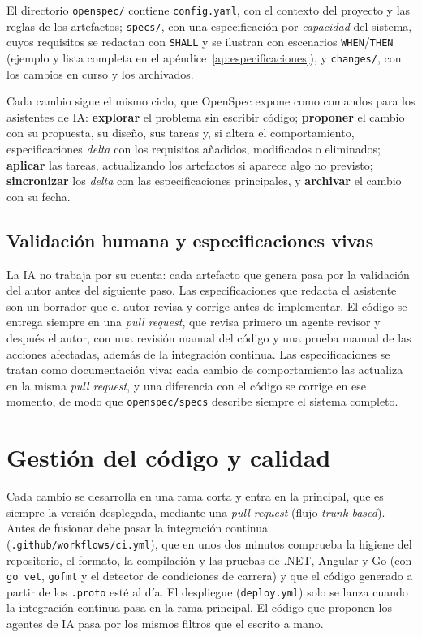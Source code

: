 El directorio \texttt{openspec/} contiene \texttt{config.yaml}, con el contexto del proyecto y las reglas de los artefactos; \texttt{specs/}, con una especificación por \emph{capacidad} del sistema, cuyos requisitos se redactan con \texttt{SHALL} y se ilustran con escenarios \texttt{WHEN}/\texttt{THEN} (ejemplo y lista completa en el apéndice~\ref{ap:especificaciones}), y \texttt{changes/}, con los cambios en curso y los archivados.

Cada cambio sigue el mismo ciclo, que OpenSpec expone como comandos para los asistentes de IA: \textbf{explorar} el problema sin escribir código; \textbf{proponer} el cambio con su propuesta, su diseño, sus tareas y, si altera el comportamiento, especificaciones \emph{delta} con los requisitos añadidos, modificados o eliminados; \textbf{aplicar} las tareas, actualizando los artefactos si aparece algo no previsto; \textbf{sincronizar} los \emph{delta} con las especificaciones principales, y \textbf{archivar} el cambio con su fecha.

\subsection{Validación humana y especificaciones vivas}
\label{sec:sdd-validacion}
\label{sec:sdd-vivas}

La IA no trabaja por su cuenta: cada artefacto que genera pasa por la validación del autor antes del siguiente paso. Las especificaciones que redacta el asistente son un borrador que el autor revisa y corrige antes de implementar. El código se entrega siempre en una \emph{pull request}, que revisa primero un agente revisor y después el autor, con una revisión manual del código y una prueba manual de las acciones afectadas, además de la integración continua. Las especificaciones se tratan como documentación viva: cada cambio de comportamiento las actualiza en la misma \emph{pull request}, y una diferencia con el código se corrige en ese momento, de modo que \texttt{openspec/specs} describe siempre el sistema completo.

\section{Gestión del código y calidad}
\label{sec:calidad}

Cada cambio se desarrolla en una rama corta y entra en la principal, que es siempre la versión desplegada, mediante una \emph{pull request} (flujo \emph{trunk-based}). Antes de fusionar debe pasar la integración continua (\texttt{.github/workflows/ci.yml}), que en unos dos minutos comprueba la higiene del repositorio, el formato, la compilación y las pruebas de .NET, Angular y Go (con \texttt{go vet}, \texttt{gofmt} y el detector de condiciones de carrera) y que el código generado a partir de los \texttt{.proto} esté al día. El despliegue (\texttt{deploy.yml}) solo se lanza cuando la integración continua pasa en la rama principal. El código que proponen los agentes de IA pasa por los mismos filtros que el escrito a mano.

